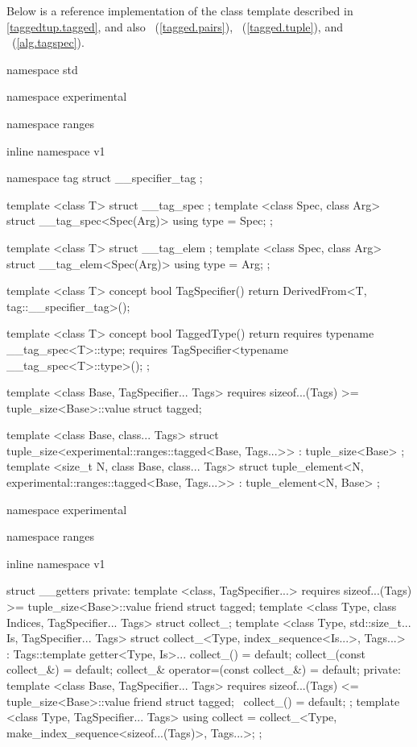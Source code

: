 \setcounter{chapter}{4}

\pnum Below is a reference implementation of the  class template described in
\ref{taggedtup.tagged}, and also ~(\ref{tagged.pairs}),
~(\ref{tagged.tuple}), and ~(\ref{alg.tagspec}).

\begin{codeblock}
namespace std { namespace experimental { namespace ranges { inline namespace v1 {
  namespace tag { struct __specifier_tag { }; }

  template <class T>
  struct __tag_spec { };
  template <class Spec, class Arg>
  struct __tag_spec<Spec(Arg)> { using type = Spec; };

  template <class T>
  struct __tag_elem { };
  template <class Spec, class Arg>
  struct __tag_elem<Spec(Arg)> { using type = Arg; };

  template <class T>
  concept bool TagSpecifier() {
    return DerivedFrom<T, tag::__specifier_tag>();
  }

  template <class T>
  concept bool TaggedType() {
    return requires {
      typename __tag_spec<T>::type;
      requires TagSpecifier<typename __tag_spec<T>::type>();
    };
  }

  template <class Base, TagSpecifier... Tags>
    requires sizeof...(Tags) >= tuple_size<Base>::value
  struct tagged;
  }}}

  template <class Base, class... Tags>
  struct tuple_size<experimental::ranges::tagged<Base, Tags...>>
    : tuple_size<Base> { };
  template <size_t N, class Base, class... Tags>
  struct tuple_element<N, experimental::ranges::tagged<Base, Tags...>>
    : tuple_element<N, Base> { };

  namespace experimental { namespace ranges { inline namespace v1 {

  struct __getters {
  private:
    template <class, TagSpecifier...>
      requires sizeof...(Tags) >= tuple_size<Base>::value
    friend struct tagged;
    template <class Type, class Indices, TagSpecifier... Tags>
    struct collect_;
    template <class Type, std::size_t... Is, TagSpecifier... Tags>
    struct collect_<Type, index_sequence<Is...>, Tags...>
      : Tags::template getter<Type, Is>... {
      collect_() = default;
      collect_(const collect_&) = default;
      collect_& operator=(const collect_&) = default;
    private:
      template <class Base, TagSpecifier... Tags>
        requires sizeof...(Tags) <= tuple_size<Base>::value
      friend struct tagged;
      ~collect_() = default;
    };
    template <class Type, TagSpecifier... Tags>
    using collect = collect_<Type, make_index_sequence<sizeof...(Tags)>, Tags...>;
  };

}}}}
\end{codeblock}
